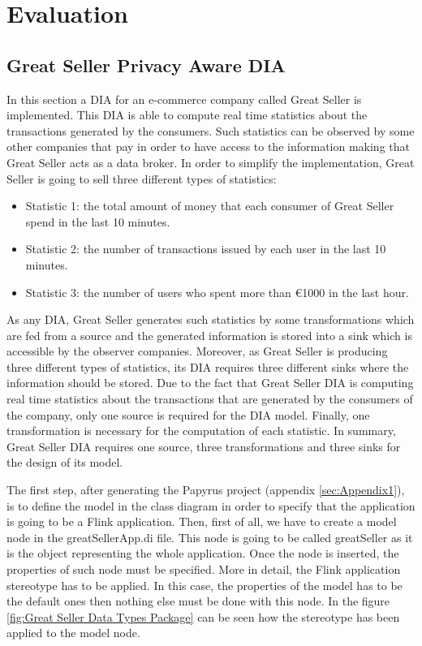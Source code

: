 \chapter[Chapter 5]{Evaluation}
\label{sec:chapter5}

\section{Great Seller Privacy Aware DIA}

In this section a DIA for an e-commerce company called Great Seller is implemented. This DIA is able to compute real time statistics about the transactions generated by the consumers. Such statistics can be observed by some other companies that pay in order to have access to the information making that Great Seller acts as a data broker. In order to simplify the implementation, Great Seller is going to sell three different types of statistics:

\begin{itemize}

\item Statistic 1: the total amount of money that each consumer of Great Seller spend in the last 10 minutes.
\item Statistic 2: the number of transactions issued by each user in the last 10 minutes.
\item Statistic 3: the number of users who spent more than \euro{1000} in the last hour.

\end{itemize}

As any DIA, Great Seller generates such statistics by some transformations which are fed from a source and the generated information is stored into a sink which is accessible by the observer companies. Moreover, as Great Seller is producing three different types of statistics, its DIA requires three different sinks where the information should be stored. Due to the fact that Great Seller DIA is computing real time statistics about the transactions that are generated by the consumers of the company, only one source is required for the DIA model. Finally, one transformation is necessary for the computation of each statistic. In summary, Great Seller DIA requires one source, three transformations and three sinks for the design of its model.

The first step, after generating the Papyrus project (appendix \ref{sec:Appendix1}), is to define the model in the class diagram in order to specify that the application is going to be a Flink application. Then, first of all, we have to create a model node in the greatSellerApp.di file. This node is going to be called greatSeller as it is the object representing the whole application. Once the node is inserted, the properties of such node must be specified. More in detail, the Flink application stereotype has to be applied. In this case, the properties of the model has to be the default ones then nothing else must be done with this node. In the figure \ref{fig:Great Seller Data Types Package} can be seen how the stereotype has been applied to the model node.

